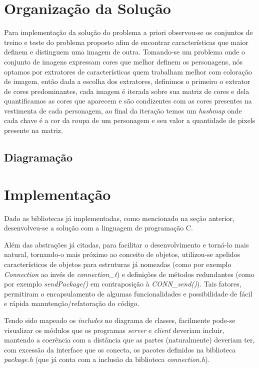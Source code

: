 \documentclass[12pt]{article}
\begin{document}
\section{Organização da Solução}\label{sec:solucao}

	Para implementação da solução do problema a priori observou-se os conjuntos de treino e teste do problema proposto afim de encontrar características que maior definem e distinguem uma imagem de outra. Tomando-se um problema onde o conjunto de imagens expressam cores que melhor definem os personagens, nós optamos por extratores de características quem trabalham melhor com coloração de imagem, então dada a escolha dos extratores, definimos o primeiro o extrator de cores predominantes, cada imagem é iterada sobre sua matriz de cores e dela quantificamos as cores que aparecem e são condizentes com as cores presentes na vestimenta de cada personagem, ao final da iteração temos um \textit{hashmap} onde cada chave é a cor da roupa de um personagem e seu valor a quantidade de pixels presente na matriz.


\subsection{Diagramação}\label{sec:diagramacao}





\section{Implementação}

Dado as bibliotecas já implementadas, como mencionado na seção anterior, desenvolveu-se a solução com a linguagem de programação C.

Além das abstrações já citadas, para facilitar o desenvolvimento e torná-lo mais natural, tornando-o mais próximo ao conceito de objetos, utilizou-se apelidos característicos de objetos para estruturas já nomeadas (como por exemplo \emph{Connection} ao invés de \emph{connection\_t}) e definições de métodos redundantes (como por exemplo \emph{sendPackage()} em contraposição à \emph{CONN\_send()}). Tais fatores, permitiram o encapsulamento de algumas funcionalidades e possibilidade de fácil e rápida manutenção/refatoração do código.

Tendo sido mapeado os \emph{includes} no diagrama de classes, facilmente pode-se visualizar os módulos que os programas \emph{server} e \emph{client} deveriam incluir, mantendo a coerência com a distância que as partes (naturalmente) deveriam ter, com excessão da interface que os conecta, os pacotes definidos na biblioteca \emph{package.h} (que já conta com a inclusão da biblioteca \emph{connection.h}).
\end{document}
